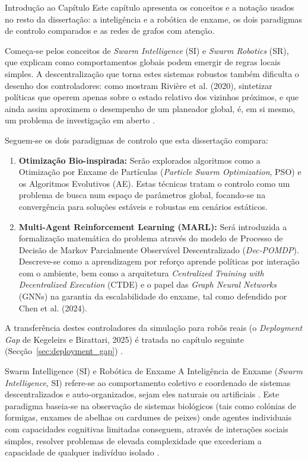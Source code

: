\documentclass[12pt,reqno, twoside]{amsbook}
\makeatletter
\def\section{\@startsection{section}{1}%
      \z@{.5\linespacing\@plus.7\linespacing}{.25\linespacing}%
      {\normalfont\bfseries\flushleft}}
\theoremstyle{plain}
\numberwithin{equation}{chapter}
\numberwithin{section}{chapter}
\numberwithin{table}{chapter}
\numberwithin{figure}{chapter}
\makeatother
\begin{document}
\section{Introdução ao Capítulo}
Este capítulo apresenta os conceitos e a notação usados no resto da dissertação: a inteligência e a robótica de enxame, os dois paradigmas de controlo comparados e as redes de grafos com atenção.

Começa-se pelos conceitos de \textit{Swarm Intelligence} (SI) e \textit{Swarm Robotics} (SR), que explicam como comportamentos globais podem emergir de regras locais simples. A descentralização que torna estes sistemas robustos também dificulta o desenho dos controladores: como mostram Rivière et al. (2020), sintetizar políticas que operem apenas sobre o estado relativo dos vizinhos próximos, e que ainda assim aproximem o desempenho de um planeador global, é, em si mesmo, um problema de investigação em aberto \cite{riviere2020glas}.

Seguem-se os dois paradigmas de controlo que esta dissertação compara:
\begin{enumerate}
    \item \textbf{Otimização Bio-inspirada:} Serão explorados algoritmos como a Otimização por Enxame de Partículas (\textit{Particle Swarm Optimization}, PSO) e os Algoritmos Evolutivos (AE). Estas técnicas tratam o controlo como um problema de busca num espaço de parâmetros global, focando-se na convergência para soluções estáveis e robustas em cenários estáticos.
    \item \textbf{Multi-Agent Reinforcement Learning (MARL):} Será introduzida a formalização matemática do problema através do modelo de Processo de Decisão de Markov Parcialmente Observável Descentralizado (\textit{Dec-POMDP}). Descreve-se como a aprendizagem por reforço aprende políticas por interação com o ambiente, bem como a arquitetura \textit{Centralized Training with Decentralized Execution} (CTDE) e o papel das \textit{Graph Neural Networks} (GNNs) na garantia da escalabilidade do enxame, tal como defendido por Chen et al. (2024).
\end{enumerate}

A transferência destes controladores da simulação para robôs reais (o \textit{Deployment Gap} de Kegeleirs e Birattari, 2025) é tratada no capítulo seguinte (Secção~\ref{sec:deployment_gap}) \cite{kegeleirs2025towards}.

\section{Swarm Intelligence (SI) e Robótica de Enxame}
A Inteligência de Enxame (\textit{Swarm Intelligence}, SI) refere-se ao comportamento coletivo e coordenado de sistemas descentralizados e auto-organizados, sejam eles naturais ou artificiais \cite{dorigo1992optimization}. Este paradigma baseia-se na observação de sistemas biológicos (tais como colónias de formigas, enxames de abelhas ou cardumes de peixes) onde agentes individuais com capacidades cognitivas limitadas conseguem, através de interações sociais simples, resolver problemas de elevada complexidade que excederiam a capacidade de qualquer indivíduo isolado \cite{kennedy1995pso}.
\end{document}
